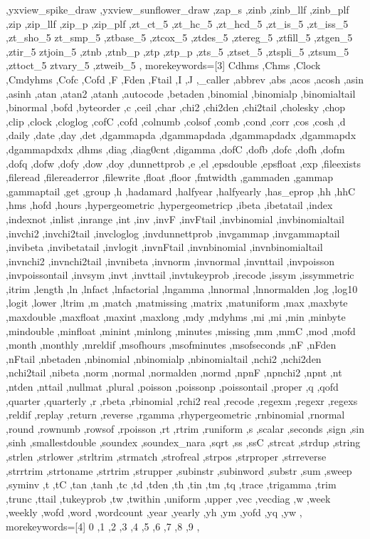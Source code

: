 {{    ,yxview_spike_draw ,yxview_sunflower_draw ,zap_s ,zinb ,zinb_llf
    ,zinb_plf ,zip ,zip_llf ,zip_p ,zip_plf ,zt_ct_5 ,zt_hc_5 ,zt_hcd_5
    ,zt_is_5 ,zt_iss_5 ,zt_sho_5 zt_smp_5 ,ztbase_5 ,ztcox_5 ,ztdes_5
    ,ztereg_5 ,ztfill_5 ,ztgen_5 ,ztir_5 ztjoin_5 ,ztnb ,ztnb_p ,ztp
    ,ztp_p ,zts_5 ,ztset_5 ,ztspli_5 ,ztsum_5 ,zttoct_5 ztvary_5
    ,ztweib_5
  },
  morekeywords=[3]{
    Cdhms ,Chms ,Clock ,Cmdyhms ,Cofc ,Cofd ,F ,Fden ,Ftail ,I ,J
    ,_caller ,abbrev ,abs ,acos ,acosh ,asin ,asinh ,atan ,atan2
    ,atanh ,autocode ,betaden ,binomial ,binomialp ,binomialtail
    ,binormal ,bofd ,byteorder ,c ,ceil ,char ,chi2 ,chi2den ,chi2tail
    ,cholesky ,chop ,clip ,clock ,cloglog ,cofC ,cofd ,colnumb ,colsof
    ,comb ,cond ,corr ,cos ,cosh ,d ,daily ,date ,day ,det ,dgammapda
    ,dgammapdada ,dgammapdadx ,dgammapdx ,dgammapdxdx ,dhms ,diag
    ,diag0cnt ,digamma ,dofC ,dofb ,dofc ,dofh ,dofm ,dofq ,dofw ,dofy
    ,dow ,doy ,dunnettprob ,e ,el ,epsdouble ,epsfloat ,exp ,fileexists
    ,fileread ,filereaderror ,filewrite ,float ,floor ,fmtwidth
    ,gammaden ,gammap ,gammaptail ,get ,group ,h ,hadamard ,halfyear
    ,halfyearly ,has_eprop ,hh ,hhC ,hms ,hofd ,hours ,hypergeometric
    ,hypergeometricp ,ibeta ,ibetatail ,index ,indexnot ,inlist
    ,inrange ,int ,inv ,invF ,invFtail ,invbinomial ,invbinomialtail
    ,invchi2 ,invchi2tail ,invcloglog ,invdunnettprob ,invgammap
    ,invgammaptail ,invibeta ,invibetatail ,invlogit ,invnFtail
    ,invnbinomial ,invnbinomialtail ,invnchi2 ,invnchi2tail ,invnibeta
    ,invnorm ,invnormal ,invnttail ,invpoisson ,invpoissontail ,invsym
    ,invt ,invttail ,invtukeyprob ,irecode ,issym ,issymmetric ,itrim
    ,length ,ln ,lnfact ,lnfactorial ,lngamma ,lnnormal ,lnnormalden
    ,log ,log10 ,logit ,lower ,ltrim ,m ,match ,matmissing ,matrix
    ,matuniform ,max ,maxbyte ,maxdouble ,maxfloat ,maxint ,maxlong ,mdy
    ,mdyhms ,mi ,mi ,min ,minbyte ,mindouble ,minfloat ,minint ,minlong
    ,minutes ,missing ,mm ,mmC ,mod ,mofd ,month ,monthly ,mreldif
    ,msofhours ,msofminutes ,msofseconds ,nF ,nFden ,nFtail ,nbetaden
    ,nbinomial ,nbinomialp ,nbinomialtail ,nchi2 ,nchi2den ,nchi2tail
    ,nibeta ,norm ,normal ,normalden ,normd ,npnF ,npnchi2 ,npnt ,nt
    ,ntden ,nttail ,nullmat ,plural ,poisson ,poissonp ,poissontail
    ,proper ,q ,qofd ,quarter ,quarterly ,r ,rbeta ,rbinomial ,rchi2
    real ,recode ,regexm ,regexr ,regexs ,reldif ,replay ,return
    ,reverse ,rgamma ,rhypergeometric ,rnbinomial ,rnormal ,round
    ,rownumb ,rowsof ,rpoisson ,rt ,rtrim ,runiform ,s ,scalar ,seconds
    ,sign ,sin ,sinh ,smallestdouble ,soundex ,soundex_nara ,sqrt ,ss
    ,ssC ,strcat ,strdup ,string ,strlen ,strlower ,strltrim ,strmatch
    ,strofreal ,strpos ,strproper ,strreverse ,strrtrim ,strtoname
    ,strtrim ,strupper ,subinstr ,subinword ,substr ,sum ,sweep ,syminv
    ,t ,tC ,tan ,tanh ,tc ,td ,tden ,th ,tin ,tm ,tq ,trace ,trigamma
    ,trim ,trunc ,ttail ,tukeyprob ,tw ,twithin ,uniform ,upper ,vec
    ,vecdiag ,w ,week ,weekly ,wofd ,word ,wordcount ,year ,yearly
    ,yh ,ym ,yofd ,yq ,yw
  },
  morekeywords=[4]{
    0 ,1 ,2 ,3 ,4 ,5 ,6 ,7 ,8 ,9
  },
}

